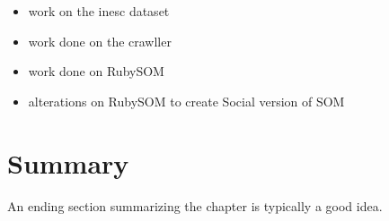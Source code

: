 
\begin{itemize}
  \item work on the inesc dataset
  \item work done on the crawller 
  \item work done on RubySOM 
  \item alterations on RubySOM to create Social version of SOM 
\end{itemize}

%


\section{Summary}
An ending section summarizing the chapter is typically a good idea.

\cleardoublepage
 
